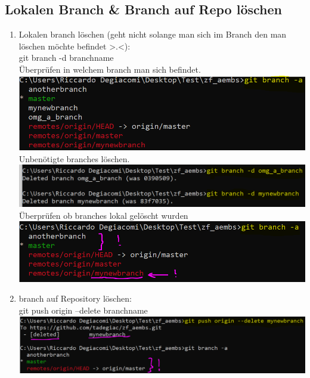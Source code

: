 \documentclass[a4paper, 8pt]{extarticle}
\begin{document}
\begin{multicols*}{3}
            \section{Lokalen Branch \& Branch auf Repo löschen}
                 \begin{enumerate}
                    \item   Lokalen branch löschen (geht nicht solange man sich im Branch den man löschen möchte befindet >.<):\\
                            git branch -d branchname\\
                            Überprüfen in welchem branch man sich befindet.\\
                                \includegraphics[width=1\linewidth, left]{img/git_delete_branch_local_1.PNG}\\
                            Unbenötigte branches löschen.\\
                                \includegraphics[width=1\linewidth, left]{img/git_delete_branch_local_2.PNG}\\
                            Überprüfen ob branches lokal gelöscht wurden\\
                                \includegraphics[width=1\linewidth, left]{img/git_delete_branch_local_3.PNG}\\   
                    \item   branch auf Repository löschen:\\
                            git push origin --delete branchname\\
                                \includegraphics[width=1\linewidth, left]{img/git_delete_branch_remotePNG.PNG}\\ 

\end{enumerate}
\end{multicols*}
\end{document}
